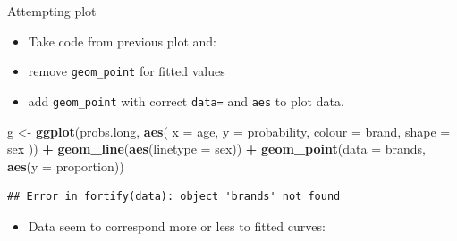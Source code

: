 \documentclass[ignorenonframetext,]{beamer}
\newenvironment{Shaded}{\begin{snugshade}}{\end{snugshade}}
\newcommand{\DataTypeTok}[1]{\textcolor[rgb]{0.13,0.29,0.53}{#1}}
\newcommand{\KeywordTok}[1]{\textcolor[rgb]{0.13,0.29,0.53}{\textbf{#1}}}
\newcommand{\NormalTok}[1]{#1}
\newcommand{\OperatorTok}[1]{\textcolor[rgb]{0.81,0.36,0.00}{\textbf{#1}}}
\newcommand{\StringTok}[1]{\textcolor[rgb]{0.31,0.60,0.02}{#1}}
\providecommand{\tightlist}{%
  \setlength{\itemsep}{0pt}\setlength{\parskip}{0pt}}
\begin{document}
\begin{frame}[fragile]{Attempting plot}
\protect\hypertarget{attempting-plot}{}

\begin{itemize}
\item
  Take code from previous plot and:
\item
  remove \texttt{geom\_point} for fitted values
\item
  add \texttt{geom\_point} with correct \texttt{data=} and \texttt{aes}
  to plot data.
\end{itemize}

\begin{Shaded}
\begin{Highlighting}[]
\NormalTok{g <-}\StringTok{ }\KeywordTok{ggplot}\NormalTok{(probs.long, }\KeywordTok{aes}\NormalTok{(}
  \DataTypeTok{x =}\NormalTok{ age, }\DataTypeTok{y =}\NormalTok{ probability,}
  \DataTypeTok{colour =}\NormalTok{ brand, }\DataTypeTok{shape =}\NormalTok{ sex}
\NormalTok{)) }\OperatorTok{+}
\StringTok{  }\KeywordTok{geom_line}\NormalTok{(}\KeywordTok{aes}\NormalTok{(}\DataTypeTok{linetype =}\NormalTok{ sex)) }\OperatorTok{+}
\StringTok{  }\KeywordTok{geom_point}\NormalTok{(}\DataTypeTok{data =}\NormalTok{ brands, }\KeywordTok{aes}\NormalTok{(}\DataTypeTok{y =}\NormalTok{ proportion))}
\end{Highlighting}
\end{Shaded}

\begin{verbatim}
## Error in fortify(data): object 'brands' not found
\end{verbatim}

\begin{itemize}
\tightlist
\item
  Data seem to correspond more or less to fitted curves:
\end{itemize}

\end{frame}
\end{document}
